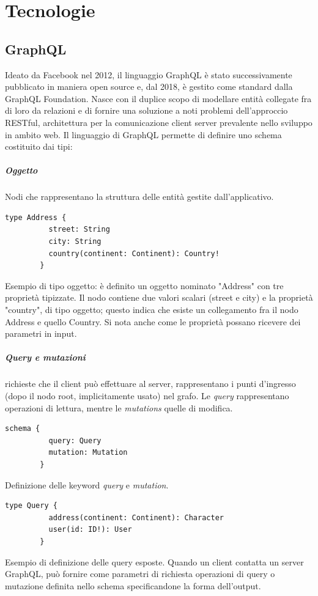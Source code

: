 \documentclass[a4paper, 12pt]{report}
\begin{document}
  \chapter{Tecnologie}
    \section{GraphQL}
      Ideato da Facebook nel 2012, il linguaggio GraphQL è stato successivamente pubblicato in maniera open source e, dal 2018, è gestito come standard dalla GraphQL Foundation.
      Nasce con il duplice scopo di modellare entità collegate fra di loro da relazioni e di fornire una soluzione a noti problemi dell'approccio RESTful, architettura per la comunicazione client server prevalente nello sviluppo in ambito web.
      Il linguaggio di GraphQL permette di definire uno schema costituito dai tipi:
      \paragraph*{Oggetto} Nodi che rappresentano la struttura delle entità gestite dall'applicativo.
      \begin{Verbatim}[samepage=true]
        type Address {
          street: String
          city: String
          country(continent: Continent): Country!
        }
      \end{Verbatim}
      Esempio di tipo oggetto: è definito un oggetto nominato "Address" con tre proprietà tipizzate.
      Il nodo contiene due valori scalari (street e city) e la proprietà "country", di tipo oggetto; questo indica che esiste un collegamento fra il nodo Address e quello Country. Si nota anche come le proprietà possano ricevere dei parametri in input.
      \paragraph*{Query e mutazioni} richieste che il client può effettuare al server, rappresentano i punti d'ingresso (dopo il nodo root, implicitamente usato) nel grafo. Le \emph{query} rappresentano operazioni di lettura, mentre le \emph{mutations} quelle di modifica.
      \begin{Verbatim}[samepage=true]
        schema {
          query: Query
          mutation: Mutation
        }
      \end{Verbatim}
      Definizione delle keyword \emph{query} e \emph{mutation}.
      \begin{Verbatim}[samepage=true]
        type Query {
          address(continent: Continent): Character
          user(id: ID!): User
        }
      \end{Verbatim}
      Esempio di definizione delle query esposte.
      Quando un client contatta un server GraphQL, può fornire come parametri di richiesta operazioni di query o mutazione definita nello schema specificandone la forma dell'output.
\end{document}
